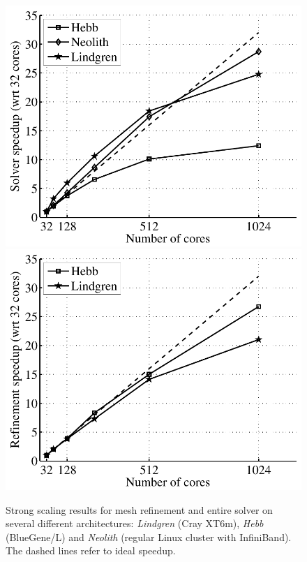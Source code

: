 \begin{figure}
  \centering
  \includegraphics[width=\largefig]{chapters/hoffman-2/pdf/speedup_solve.pdf} \\
  \includegraphics[width=\largefig]{chapters/hoffman-2/pdf/speedup_unrivara.pdf}
  \caption{\label{fig:hoffman-2:sp} Strong scaling results for mesh
    refinement and entire solver on several different architectures:
    \textit{Lindgren} (Cray XT6m), \textit{Hebb} (BlueGene/L) and
    \textit{Neolith} (regular Linux cluster with InfiniBand). The
    dashed lines refer to ideal speedup.}
\end{figure}

